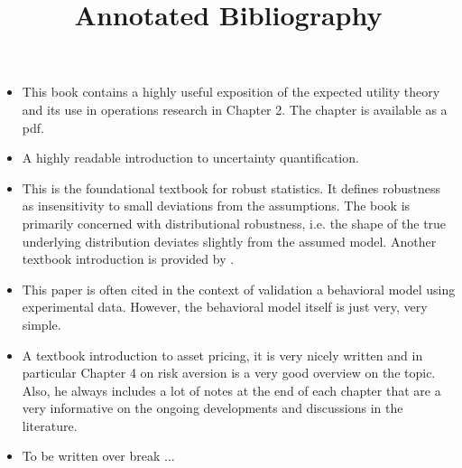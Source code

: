 

\title{Annotated Bibliography}
\author{}
\date{}



\maketitle
\begin{itemize}
\item {}

This book contains a highly useful exposition of the expected utility theory and its use in operations research in Chapter 2. The chapter is available as a pdf.

\item {}

A highly readable introduction to uncertainty quantification.

\item {}

This is the foundational textbook for robust statistics. It defines robustness as insensitivity to small deviations from the assumptions. The book is primarily concerned with distributional robustness, i.e. the shape of the true underlying distribution deviates slightly from the assumed model. Another textbook introduction is provided by \citet{Maronna.2006}. 

\item {}

This paper is often cited in the context of validation a behavioral model using experimental data. However, the behavioral model itself is just very, very simple.

\item {}

A textbook introduction to asset pricing, it is very nicely written and in particular Chapter 4 on risk aversion is a very good overview on the topic. Also,  he always includes a lot of notes at the end of each chapter that are a very informative on the ongoing developments and discussions in the literature.

\item {}

To be written over break ...

\end{itemize}





